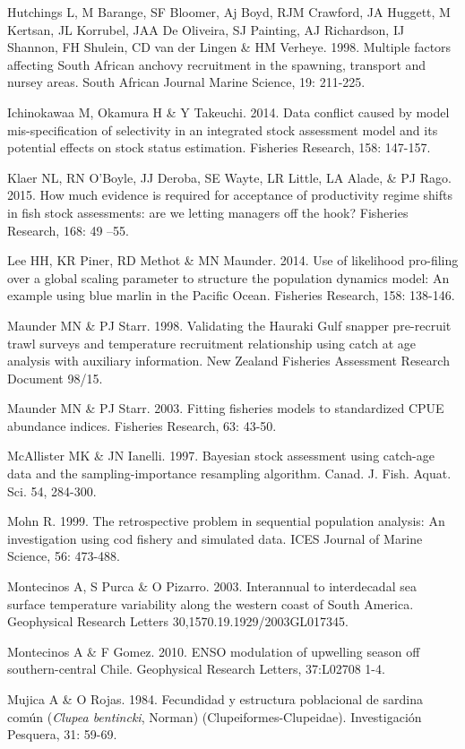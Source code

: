 \documentclass[
  spanish,
]{article}
\begin{document}
Hutchings L, M Barange, SF Bloomer, Aj Boyd, RJM Crawford, JA Huggett, M
Kertsan, JL Korrubel, JAA De Oliveira, SJ Painting, AJ Richardson, IJ
Shannon, FH Shulein, CD van der Lingen \& HM Verheye. 1998. Multiple
factors affecting South African anchovy recruitment in the spawning,
transport and nursey areas. South African Journal Marine Science, 19:
211-225.

Ichinokawaa M, Okamura H \& Y Takeuchi. 2014. Data conflict caused by
model mis-specification of selectivity in an integrated stock assessment
model and its potential effects on stock status estimation. Fisheries
Research, 158: 147-157.

Klaer NL, RN O'Boyle, JJ Deroba, SE Wayte, LR Little, LA Alade, \& PJ
Rago. 2015. How much evidence is required for acceptance of productivity
regime shifts in fish stock assessments: are we letting managers off the
hook? Fisheries Research, 168: 49 --55.

Lee HH, KR Piner, RD Methot \& MN Maunder. 2014. Use of likelihood
pro-filing over a global scaling parameter to structure the population
dynamics model: An example using blue marlin in the Pacific Ocean.
Fisheries Research, 158: 138-146.

Maunder MN \& PJ Starr. 1998. Validating the Hauraki Gulf snapper
pre-recruit trawl surveys and temperature recruitment relationship using
catch at age analysis with auxiliary information. New Zealand Fisheries
Assessment Research Document 98/15.

Maunder MN \& PJ Starr. 2003. Fitting fisheries models to standardized
CPUE abundance indices. Fisheries Research, 63: 43-50.

McAllister MK \& JN Ianelli. 1997. Bayesian stock assessment using
catch-age data and the sampling-importance resampling algorithm. Canad.
J. Fish. Aquat. Sci. 54, 284-300.

Mohn R. 1999. The retrospective problem in sequential population
analysis: An investigation using cod fishery and simulated data. ICES
Journal of Marine Science, 56: 473-488.

Montecinos A, S Purca \& O Pizarro. 2003. Interannual to interdecadal
sea surface temperature variability along the western coast of South
America. Geophysical Research Letters 30,1570.19.1929/2003GL017345.

Montecinos A \& F Gomez. 2010. ENSO modulation of upwelling season off
southern-central Chile. Geophysical Research Letters, 37:L02708 1-4.

Mujica A \& O Rojas. 1984. Fecundidad y estructura poblacional de
sardina común (\emph{Clupea bentincki}, Norman)
(Clupeiformes-Clupeidae). Investigación Pesquera, 31: 59-69.
\end{document}
